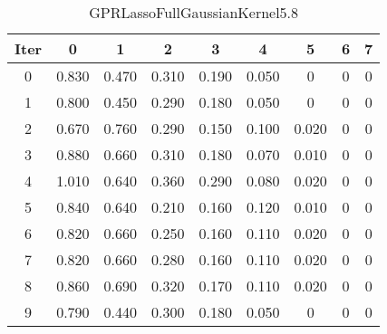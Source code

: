 \begin{table}
	\begin{center}
		\begin{tabular}{|c|c|c|c|c|c|c|c|c|}
			\hline
			Iter & 0 & 1 & 2 & 3 & 4 & 5 & 6 & 7 \\
			\hline
			0 & 0.830 & 0.470 & 0.310 & 0.190 & 0.050 & 0 & 0 & 0 \\
			\hline
			1 & 0.800 & 0.450 & 0.290 & 0.180 & 0.050 & 0 & 0 & 0 \\
			\hline
			2 & 0.670 & 0.760 & 0.290 & 0.150 & 0.100 & 0.020 & 0 & 0 \\
			\hline
			3 & 0.880 & 0.660 & 0.310 & 0.180 & 0.070 & 0.010 & 0 & 0 \\
			\hline
			4 & 1.010 & 0.640 & 0.360 & 0.290 & 0.080 & 0.020 & 0 & 0 \\
			\hline
			5 & 0.840 & 0.640 & 0.210 & 0.160 & 0.120 & 0.010 & 0 & 0 \\
			\hline
			6 & 0.820 & 0.660 & 0.250 & 0.160 & 0.110 & 0.020 & 0 & 0 \\
			\hline
			7 & 0.820 & 0.660 & 0.280 & 0.160 & 0.110 & 0.020 & 0 & 0 \\
			\hline
			8 & 0.860 & 0.690 & 0.320 & 0.170 & 0.110 & 0.020 & 0 & 0 \\
			\hline
			9 & 0.790 & 0.440 & 0.300 & 0.180 & 0.050 & 0 & 0 & 0 \\
			\hline
		\end{tabular}
	\end{center}
	\caption{GPRLassoFullGaussianKernel5.8}
\end{table}